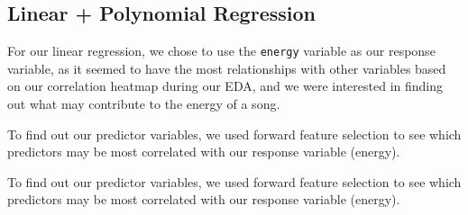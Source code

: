 \documentclass[11pt]{article}
\begin{document}
    \subsection{Linear + Polynomial
Regression}\label{linear-polynomial-regression}

For our linear regression, we chose to use the \texttt{energy} variable
as our response variable, as it seemed to have the most relationships
with other variables based on our correlation heatmap during our EDA,
and we were interested in finding out what may contribute to the energy
of a song.

To find out our predictor variables, we used forward feature selection
to see which predictors may be most correlated with our response
variable (energy).

    To find out our predictor variables, we used forward feature selection
to see which predictors may be most correlated with our response
variable (energy).
\end{document}
